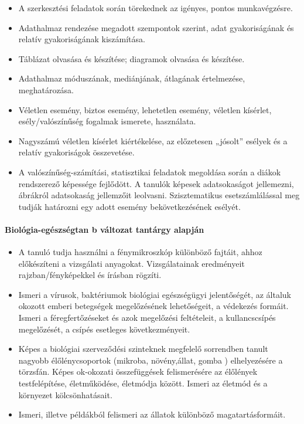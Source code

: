 \begin{itemize}
\item A szerkesztési feladatok során törekednek az igényes, pontos munkavégzésre.
\item Adathalmaz rendezése megadott szempontok szerint, adat gyakoriságának és relatív gyakoriságának kiszámítása.
\item Táblázat olvasása és készítése; diagramok olvasása és készítése.
\item Adathalmaz móduszának, mediánjának, átlagának értelmezése, meghatározása.
\item Véletlen esemény, biztos esemény, lehetetlen esemény, véletlen kísérlet, esély/valószínűség fogalmak ismerete, használata.
\item Nagyszámú véletlen kísérlet kiértékelése, az előzetesen „jósolt” esélyek és a relatív gyakoriságok összevetése.
\item A valószínűség-számítási, statisztikai feladatok megoldása során a diákok rendszerező képessége fejlődött. A tanulók képesek adatsokaságot jellemezni, ábrákról adatsokaság jellemzőit leolvasni. Szisztematikus esetszámlálással meg tudják határozni egy adott esemény bekövetkezésének esélyét.
\end{itemize}
\paragraph{Biológia-egészségtan
b változat tantárgy alapján}
\begin{itemize}
\item A tanuló tudja használni a fénymikroszkóp különböző fajtáit, ahhoz előkészíteni a vizsgálati anyagokat. Vizsgálatainak eredményeit rajzban/fényképekkel és írásban rögzíti.
\item Ismeri a vírusok, baktériumok biológiai egészségügyi jelentőségét, az általuk okozott emberi betegségek megelőzésének lehetőségeit, a védekezés formáit. Ismeri a féregfertőzéseket és azok megelőzési feltételeit, a kullancscsípés megelőzését, a csípés esetleges következményeit.
\item Képes a biológiai szerveződési szinteknek megfelelő sorrendben tanult nagyobb élőlénycsoportok (mikroba, növény,állat, gomba ) elhelyezésére a törzsfán. Képes ok-okozati összefüggések felismerésére az élőlények testfelépítése, életműködése, életmódja között. Ismeri az életmód és a környezet kölcsönhatásait.
\item Ismeri, illetve példákból felismeri az állatok különböző magatartásformáit.
\end{itemize}
